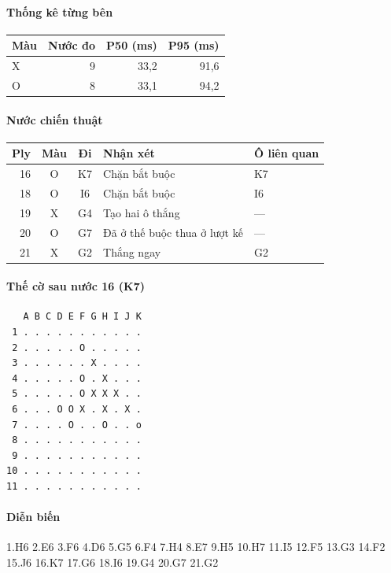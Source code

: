 \paragraph{Thống kê từng bên}
\begin{center}\small
\begin{tabular}{@{}lrrr@{}}
\toprule
Màu & Nước đo & P50 (ms) & P95 (ms) \\
\midrule
X & 9 & 33,2 & 91,6 \\
O & 8 & 33,1 & 94,2 \\
\bottomrule
\end{tabular}
\end{center}
\paragraph{Nước chiến thuật}
\begin{center}\small
\begin{tabular}{@{}rccll@{}}
\toprule
Ply & Màu & Đi & Nhận xét & Ô liên quan \\
\midrule
16 & O & K7 & Chặn bắt buộc & K7 \\
18 & O & I6 & Chặn bắt buộc & I6 \\
19 & X & G4 & Tạo hai ô thắng & — \\
20 & O & G7 & Đã ở thế buộc thua ở lượt kế & — \\
21 & X & G2 & Thắng ngay & G2 \\
\bottomrule
\end{tabular}
\end{center}
\paragraph{Thế cờ sau nước 16 (K7)}
\begin{verbatim}
   A B C D E F G H I J K
 1 . . . . . . . . . . .
 2 . . . . . O . . . . .
 3 . . . . . . X . . . .
 4 . . . . . O . X . . .
 5 . . . . . O X X X . .
 6 . . . O O X . X . X .
 7 . . . . O . . O . . o
 8 . . . . . . . . . . .
 9 . . . . . . . . . . .
10 . . . . . . . . . . .
11 . . . . . . . . . . .
\end{verbatim}
\paragraph{Diễn biến}
{\footnotesize 1.H6 2.E6 3.F6 4.D6 5.G5 6.F4 7.H4 8.E7 9.H5 10.H7 11.I5 12.F5 13.G3 14.F2 15.J6 16.K7 17.G6 18.I6 19.G4 20.G7 21.G2\par}
